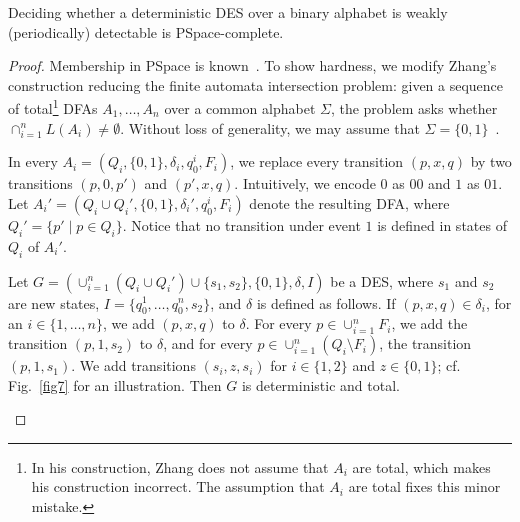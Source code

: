 \documentclass[twocolumn,amsthm]{autartx}
\begin{document}
  \begin{thm}\label{thm6}
    Deciding whether a deterministic DES over a binary alphabet is weakly (periodically) detectable is PSpace-complete.
  \end{thm}
  \begin{proof}
    Membership in PSpace is known~\cite{Zhang17}. To show hardness, we modify Zhang's construction reducing the finite automata intersection problem: given a sequence of total\footnote{In his construction, Zhang does not assume that $A_i$ are total, which makes his construction incorrect. The assumption that $A_i$ are total fixes this minor mistake.} DFAs $A_1,\ldots, A_n$ over a common alphabet $\Sigma$, the problem asks whether $\cap_{i=1}^{n} L(A_i) \neq \emptyset$. Without loss of generality, we may assume that $\Sigma=\{0,1\}$~\cite{Kozen77}.
    
    In every $A_i=(Q_i,\{0,1\},\delta_i,q_0^i,F_i)$, we replace every transition $(p,x,q)$ by two transitions $(p,0,p')$ and $(p',x,q)$. Intuitively, we encode $0$ as $00$ and $1$ as $01$. Let $A_i'=(Q_i\cup Q_i',\{0,1\},\delta_i',q_0^i,F_i)$ denote the resulting DFA, where $Q_i' = \{p' \mid p\in Q_i\}$. Notice that no transition under event $1$ is defined in states of $Q_i$ of $A_i'$. 

    Let $G=(\cup_{i=1}^{n} (Q_i \cup Q_i') \cup\{s_1,s_2\},\{0,1\},\delta,I)$ be a DES, where $s_1$ and $s_2$ are new states, $I=\{q_0^1,\ldots,q_0^n,s_2\}$, and $\delta$ is defined as follows. If $(p,x,q)\in\delta_i$, for an $i\in\{1,\ldots,n\}$, we add $(p,x,q)$ to $\delta$. For every $p\in \cup_{i=1}^{n} F_i$, we add the transition $(p,1,s_2)$ to $\delta$, and for every $p\in \cup_{i=1}^{n} (Q_i\setminus F_i)$, the transition $(p,1,s_1)$. We add transitions $(s_i,z,s_i)$ for $i\in\{1,2\}$ and $z\in\{0,1\}$; cf. Fig.~\ref{fig7} for an illustration. Then $G$ is deterministic and total.
    \begin{figure}
      \centering
\end{figure}
\end{proof}
\end{document}
